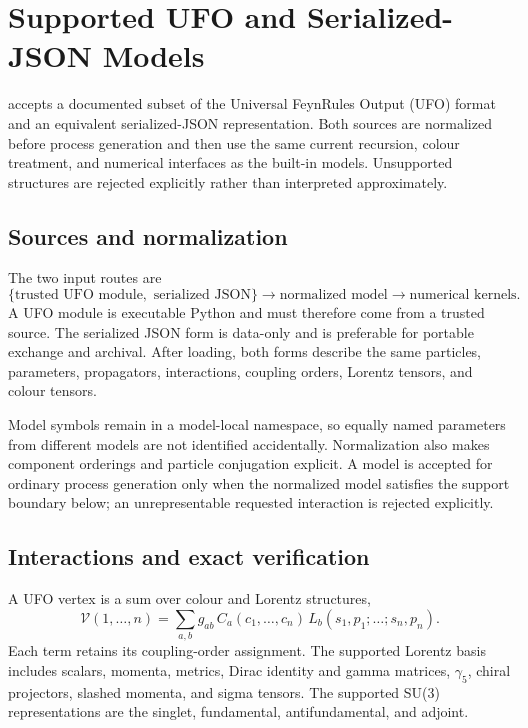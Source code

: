 \section{Supported UFO and Serialized-JSON Models}
\label{sec:ufo-support}

\PAC{} accepts a documented subset of the Universal FeynRules Output (UFO)
format and an equivalent serialized-JSON representation. Both sources are
normalized before process generation and then use the same current recursion,
colour treatment, and numerical interfaces as the built-in models. Unsupported
structures are rejected explicitly rather than interpreted approximately.

\subsection{Sources and normalization}

The two input routes are
\begin{equation}
  \{\text{trusted UFO module},\text{ serialized JSON}\}
  \longrightarrow
  \text{normalized model}
  \longrightarrow
  \text{numerical kernels}.
  \label{eq:ufo-loading-route}
\end{equation}
A UFO module is executable Python and must therefore come from a trusted
source. The serialized JSON form is data-only and is preferable for portable
exchange and archival. After loading, both forms describe the same particles,
parameters, propagators, interactions, coupling orders, Lorentz tensors, and
colour tensors.

Model symbols remain in a model-local namespace, so equally named parameters
from different models are not identified accidentally. Normalization also
makes component orderings and particle conjugation explicit. A model is
accepted for ordinary process generation only when the normalized model
satisfies the support boundary below; an unrepresentable requested interaction
is rejected explicitly.

\subsection{Interactions and exact verification}

A UFO vertex is a sum over colour and Lorentz structures,
\begin{equation}
  \mathcal V(1,\ldots,n)
  =\sum_{a,b}g_{ab}\,
    C_a(c_1,\ldots,c_n)\,
    L_b(s_1,p_1;\ldots;s_n,p_n).
  \label{eq:ufo-vertex-matrix}
\end{equation}
Each term retains its coupling-order assignment. The supported Lorentz basis
includes scalars, momenta, metrics, Dirac identity and gamma matrices,
\(\gamma_5\), chiral projectors, slashed momenta, and sigma tensors. The
supported SU(3) representations are the singlet, fundamental,
antifundamental, and adjoint.

